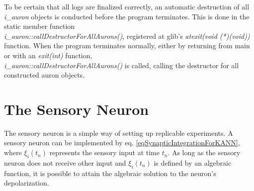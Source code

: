 			To be certain that all logs are finalized correctly, an automatic destruction of all \emph{i\_auron} objects is conducted before the program terminates.
			This is done in the static member function \\ %
				\emph{i\_auron::callDestructorForAllAurons()}, registered at glib's \emph{atexit(void (*)(void))} function.
			When the program terminates normally, either by returning from main or with an \emph{exit(int)} function, \\ %
				\emph{i\_auron::callDestructorForAllAurons()} is called, calling the destructor for all constructed auron objects.







		\section{The Sensory Neuron} 		%
		\label{appendixSensoryNode}
			The sensory neuron is a simple way of setting up replicable experiments. %
			A sensory neuron can be implemented by eq. \eqref{eqSynapticIntegrationForKANN}, where $\xi_i(t_n)$ represents the sensory input at time $t_n$.
			As long as the sensory neuron does not receive other input and $\xi_i(t_n)$ is defined by an algebraic function, it is possible to attain the algebraic solution to the neuron's depolarization.


